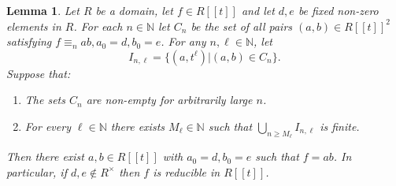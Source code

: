 \documentclass{article}
\newcommand{\N}{\mathbb{N}}
\theoremstyle{plain}
\newtheorem{lemma}[theorem]{Lemma}
\theoremstyle{definition}
\theoremstyle{remark}
\theoremstyle{plain}
\begin{document}
\begin{lemma}\label{tree}
    Let $R$ be a domain, let $f \in R[[t]]$ and let $d,e$ be fixed non-zero elements in $R$. For each $n \in \N$ let $C_n$ be the set of all pairs $(a,b) \in R[[t]]^2$ satisfying $f \equiv_n ab, a_0 = d, b_0 = e$. For any $n,\ell \in \N$, let 
    $$I_{n,\ell} = \{(a,t^\ell)|(a,b) \in C_n\}.$$
    Suppose that: \begin{enumerate}
        \item The sets $C_n$ are non-empty for arbitrarily large $n$.
        \item For every $\ell \in \N$ there exists $M_\ell \in \N$ such that $\bigcup_{n \geq M_\ell} I_{n,\ell}$ is finite.
    \end{enumerate}
    Then there exist $a,b \in R[[t]]$ with $a_0 = d, b_0 = e$ such that $f  = ab$. In particular, if $d,e \notin R^\times$ then $f$ is reducible in $R[[t]]$. 
\end{lemma}
\end{document}
